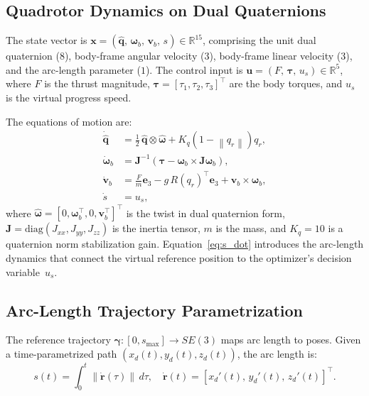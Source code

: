 \documentclass[journal]{IEEEtran}
\newcommand{\dq}{\hat{\bm{q}}}           %
\newcommand{\SE}{SE(3)}                   %
\newcommand{\R}{\mathbb{R}}              %
\newcommand{\norm}[1]{\left\| #1 \right\|}
\begin{document}
\subsection{Quadrotor Dynamics on Dual Quaternions}

The state vector is $\bm{x} = (\dq,\, \bm{\omega}_b,\, \bm{v}_b,\, s) \in \R^{15}$, comprising the unit dual quaternion ($8$), body-frame angular velocity ($3$), body-frame linear velocity ($3$), and the arc-length parameter ($1$). The control input is $\bm{u} = (F,\, \bm{\tau},\, u_s) \in \R^5$, where $F$ is the thrust magnitude, $\bm{\tau} = [\tau_1, \tau_2, \tau_3]^\top$ are the body torques, and $u_s$ is the virtual progress speed.

The equations of motion are:
\begin{subequations}
\label{eq:dynamics}
\begin{align}
    \dot{\dq} &= \frac{1}{2}\, \dq \otimes \hat{\bm{\omega}} + K_q\left(1 - \norm{q_r}\right) q_r, \label{eq:dq_dot}\\
    \dot{\bm{\omega}}_b &= \bm{J}^{-1}\left(\bm{\tau} - \bm{\omega}_b \times \bm{J}\bm{\omega}_b\right), \label{eq:omega_dot}\\
    \dot{\bm{v}}_b &= \frac{F}{m}\bm{e}_3 - g\, R(q_r)^\top \bm{e}_3 + \bm{v}_b \times \bm{\omega}_b, \label{eq:v_dot}\\
    \dot{s} &= u_s, \label{eq:s_dot}
\end{align}
\end{subequations}
where $\hat{\bm{\omega}} = [0, \bm{\omega}_b^\top, 0, \bm{v}_b^\top]^\top$ is the twist in dual quaternion form, $\bm{J} = \text{diag}(J_{xx}, J_{yy}, J_{zz})$ is the inertia tensor, $m$ is the mass, and $K_q = 10$ is a quaternion norm stabilization gain. Equation~\eqref{eq:s_dot} introduces the arc-length dynamics that connect the virtual reference position to the optimizer's decision variable~$u_s$.

\subsection{Arc-Length Trajectory Parametrization}

The reference trajectory $\bm{\gamma}: [0, s_{\max}] \to \SE$ maps arc length to poses. Given a time-parametrized path $(x_d(t), y_d(t), z_d(t))$, the arc length is:
\begin{equation}
    s(t) = \int_0^t \norm{\dot{\bm{r}}(\tau)}\, d\tau, \quad \dot{\bm{r}}(t) = [x_d'(t),\, y_d'(t),\, z_d'(t)]^\top.
    \label{eq:arc_length}
\end{equation}
\end{document}

